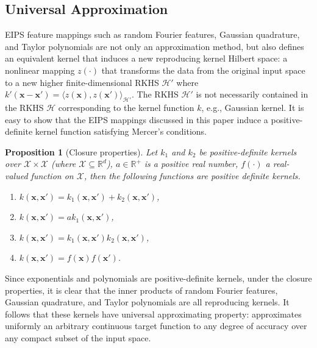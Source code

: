 \documentclass[8pt,twocolumn]{IEEEtran}
\newcommand{\R}{\mathbb{R}}
\newcommand{\x}{\mathbf{x}}
\newtheorem{pro}{Proposition}
\begin{document}
\subsection{Universal Approximation}
EIPS feature mappings such as random Fourier features, Gaussian quadrature, and Taylor polynomials are not only an approximation method, but also defines an equivalent kernel that induces a new reproducing kernel Hilbert space: a nonlinear mapping $z(\cdot)$ that transforms the data from the original input space to a new higher finite-dimensional RKHS $\mathcal{H}'$ where $k'(\x-\x')=\langle z(\x),z(\x')\rangle_{\mathcal{H}'}$. The RKHS $\mathcal{H}'$ is not necessarily contained in the RKHS $\mathcal{H}$ corresponding to the kernel function $k$, e.g., Gaussian kernel. It is easy to show that the EIPS mappings discussed in this paper induce a positive-definite kernel function satisfying Mercer's conditions.

\begin{pro}[Closure properties]
	Let $k_1$ and $k_2$ be positive-definite kernels over $\mathcal{X}\times\mathcal{X}$ (where $\mathcal{X}\subseteq\R^d$), $a\in \R^+$ is a positive real number, $f(\cdot)$ a real-valued function on $\mathcal{X}$, then the following functions are positive definite kernels.
	\begin{enumerate}
		\item $k(\x,\x') = k_1(\x,\x')+k_2(\x,\x')$,
		\item $k(\x,\x') = ak_1(\x,\x')$,
		\item $k(\x,\x') = k_1(\x,\x')k_2(\x,\x')$,
		\item $k(\x,\x') = f(\x)f(\x')$.
	\end{enumerate}
\end{pro}
Since exponentials and polynomials are positive-definite kernels, under the closure properties, it is clear that the inner products of random Fourier features, Gaussian quadrature, and Taylor polynomials are all reproducing kernels. It follows that these kernels have universal approximating property: approximates uniformly an arbitrary continuous target function to any degree of accuracy over any compact subset of the input space.
\end{document}
